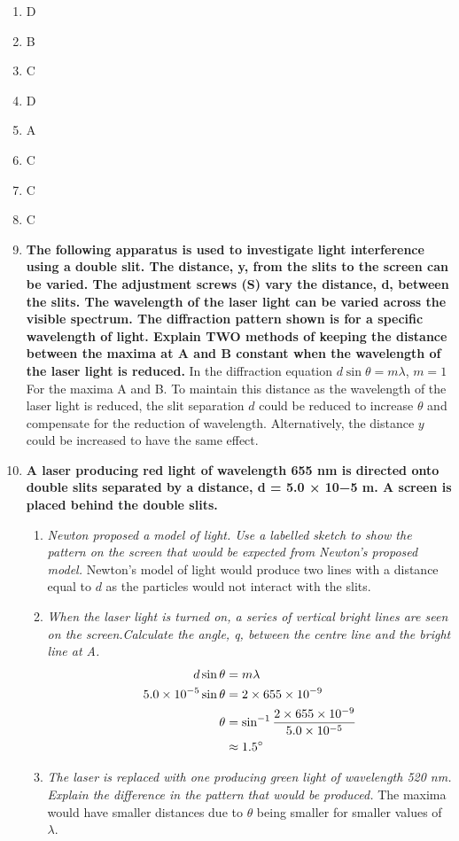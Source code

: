 \documentclass{report}
\newcommand{\asin}{\sin^{-1}}
\newcommand{\ta}{\theta}
\begin{document}
		\begin{enumerate}
			\item D
			\item B
			\item C
			\item D
			\item A
			\item C
			\item C
			\item C
			\item \textbf{The following apparatus is used to investigate light interference using a double slit. The distance, y, from the slits to the screen can be varied. The adjustment screws (S) vary the distance, d, between the slits. The wavelength of the laser light can be varied across the visible spectrum. The diffraction pattern shown is for a specific wavelength of light. Explain TWO methods of keeping the distance between the maxima at A and B constant when the wavelength of the laser light is reduced.}	
				\subitem In the diffraction equation $d \sin{\ta} = m \lambda$, $m = 1$ For the maxima A and B. To maintain this distance as the wavelength of the laser light is reduced, the slit separation $d$ could be reduced to increase $\ta$ and compensate for the reduction of wavelength. Alternatively, the distance $y$ could be increased to have the same effect.

			\item \textbf{A laser producing red light of wavelength 655 nm is directed onto double slits separated by a distance, d = 5.0 × 10−5 m. A screen is placed behind the double slits.}
				\begin{enumerate}
					\item \textit{Newton proposed a model of light. Use a labelled sketch to show the pattern on the screen that would be expected from Newton’s proposed model.}
						\subitem Newton's model of light would produce two lines with a distance equal to $d$ as the particles would not interact with the slits.

					\item \textit{When the laser light is turned on, a series of vertical bright lines are seen on the screen.Calculate the angle, q, between the centre line and the bright line at A.}
						\begin{align*}
							d \sin{\ta} &= m \lambda \\
							5.0 \times 10^{-5} \sin{\ta} &= 2 \times 655 \times 10^{-9} \\
							\ta &= \asin{\frac{2 \times 655 \times 10^{-9}}{5.0 \times 10^{-5}}} \\
							    &\approx 1.5 \degree
						\end{align*}

					\item \textit{The laser is replaced with one producing green light of wavelength 520 nm. Explain the difference in the pattern that would be produced.}
						\subitem The maxima would have smaller distances due to $\ta$ being smaller for smaller values of $\lambda$.
				\end{enumerate}

		\end{enumerate}
	
\end{document}
